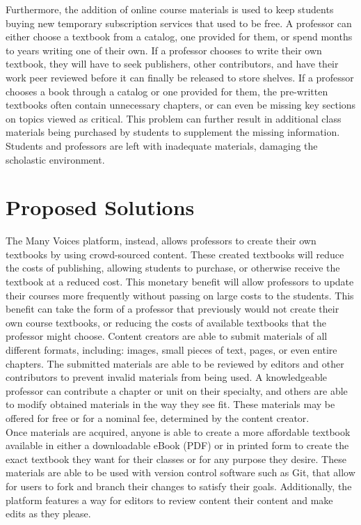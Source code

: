 \documentclass[onecolumn, draftclsnofoot,10pt, compsoc]{IEEEtran}
\begin{document}
\noindent Furthermore, the addition of online course materials is used 
to keep students buying new temporary subscription services that used to 
be free. 
A professor can either choose a textbook from a catalog, one provided 
for them, or spend months to years writing one of their own. 
If a professor chooses to write their own textbook, 
they will have to seek publishers, other contributors, and have 
their work peer reviewed before it can finally be released to store 
shelves. 
If a professor chooses a book through a catalog or one provided for 
them, the pre-written textbooks often contain unnecessary chapters, 
or can even be missing key sections on topics viewed as critical. 
This problem can further result in additional class materials being 
purchased by students to supplement the missing information. 
Students and professors are left with inadequate materials, damaging 
the scholastic environment. \\

\section{Proposed Solutions}


\noindent The Many Voices platform, instead, allows professors to create 
their own textbooks by using crowd-sourced content. These created textbooks
will reduce the costs of publishing, allowing students to purchase, or 
otherwise receive the textbook at a reduced cost. This monetary benefit
will allow professors to update their courses more frequently without 
passing on large costs to the students. This benefit can take the form of 
a professor that previously would not create their own course textbooks, or 
reducing the costs of available textbooks that the professor might choose.
Content creators are able to submit materials of all different formats, 
including: images, small pieces of text, pages, or even entire chapters. 
The submitted materials are able to be reviewed by editors and 
other contributors to prevent invalid materials from being used.
A knowledgeable professor can contribute a chapter or unit on 
their specialty, and others are able to modify obtained materials 
in the way they see fit. These materials may be offered for free 
or for a nominal fee, determined by the content creator. \\

\noindent Once materials are acquired, anyone is able to create a more 
affordable textbook available in either a downloadable eBook (PDF) or in 
printed form to create the exact textbook they want for their classes or 
for any purpose they desire. 
These materials are able to be used with version control software such 
as Git, that allow for users to fork and branch their changes to 
satisfy their goals.
Additionally, the platform features a way for editors to review 
content their content and make edits as they please. \\
\end{document}
